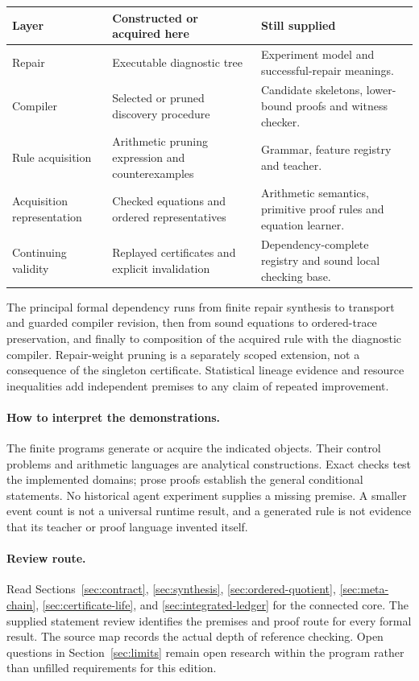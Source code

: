 \documentclass[11pt,letterpaper]{article}
\theoremstyle{plain}
\theoremstyle{definition}
\begin{document}
\begin{center}\small
\begin{tabularx}{\textwidth}{@{}p{}XX@{}}\toprule
Layer & Constructed or acquired here & Still supplied\\\midrule
Repair & Executable diagnostic tree & Experiment model and successful-repair meanings.\\
Compiler & Selected or pruned discovery procedure & Candidate skeletons, lower-bound proofs and witness checker.\\
Rule acquisition & Arithmetic pruning expression and counterexamples & Grammar, feature registry and teacher.\\
Acquisition representation & Checked equations and ordered representatives & Arithmetic semantics, primitive proof rules and equation learner.\\
Continuing validity & Replayed certificates and explicit invalidation & Dependency-complete registry and sound local checking base.\\\bottomrule
\end{tabularx}\end{center}

The principal formal dependency runs from finite repair synthesis to transport and guarded compiler revision, then from sound equations to ordered-trace preservation, and finally to composition of the acquired rule with the diagnostic compiler. Repair-weight pruning is a separately scoped extension, not a consequence of the singleton certificate. Statistical lineage evidence and resource inequalities add independent premises to any claim of repeated improvement.

\paragraph{How to interpret the demonstrations.}
The finite programs generate or acquire the indicated objects. Their control problems and arithmetic languages are analytical constructions. Exact checks test the implemented domains; prose proofs establish the general conditional statements. No historical agent experiment supplies a missing premise. A smaller event count is not a universal runtime result, and a generated rule is not evidence that its teacher or proof language invented itself.

\paragraph{Review route.}
Read Sections~\ref{sec:contract}, \ref{sec:synthesis}, \ref{sec:ordered-quotient}, \ref{sec:meta-chain}, \ref{sec:certificate-life}, and \ref{sec:integrated-ledger} for the connected core. The supplied statement review identifies the premises and proof route for every formal result. The source map records the actual depth of reference checking. Open questions in Section~\ref{sec:limits} remain open research within the program rather than unfilled requirements for this edition.
\clearpage{}
\end{document}
